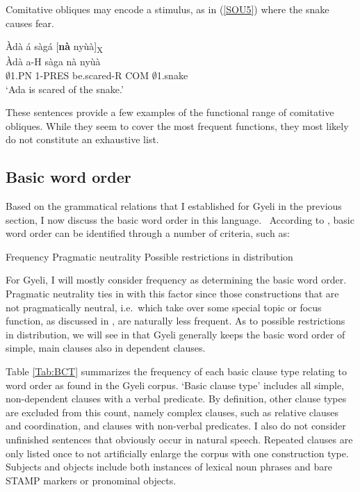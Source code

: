 \noindent Comitative obliques may encode a stimulus, as in (\ref{SOU5}) where the snake causes fear.

\begin{exe} 
\ex\label{SOU5}
  \glll Àdà á sàgá [{\bfseries nà} nyùà]\textsubscript{X}  \\
        Àdà a-H sàga nà nyùà  \\
        $\emptyset$1.PN 1-PRES be.scared-R COM $\emptyset$1.snake  \\
    \trans `Ada is scared of the snake.'
\end{exe}

\noindent These sentences provide a few examples of the functional range of comitative obliques. While they seem to cover the most frequent functions, they most likely do not constitute an exhaustive list.






\subsection{Basic word order}
\label{sec:BasicCT}

Based on the grammatical relations that I established for Gyeli in the previous section, I now discuss the  basic word order in this language.%
\ According to \citet[73-76]{dryer2007b}, basic word order can be identified through a number of criteria, such as:
\begin{enumerate}
\itshapeem Frequency
\itshapeem Pragmatic neutrality
\itshapeem Possible restrictions in distribution
\end{enumerate}
For Gyeli, I will mostly consider frequency as determining the basic word order. Pragmatic neutrality ties in with this factor since those constructions that are not pragmatically neutral, i.e.\ which take over some special topic or focus function, as discussed in , are naturally less frequent. As to possible restrictions in distribution, we will see in  that Gyeli generally keeps the basic word order of simple, main clauses also in dependent clauses.


Table \ref{Tab:BCT} summarizes the frequency of each basic clause type relating to word order as found in the Gyeli corpus. `Basic clause type' includes all simple, non-dependent clauses with a verbal predicate. 
By definition, other clause types are excluded from this count, namely complex clauses, such as relative clauses and coordination,  and clauses with non-verbal predicates. I also do not consider unfinished sentences that obviously occur in natural speech. Repeated clauses are only listed once to not artificially enlarge the corpus with one construction type. Subjects and objects include both instances of lexical noun phrases and bare STAMP markers or pronominal objects.


